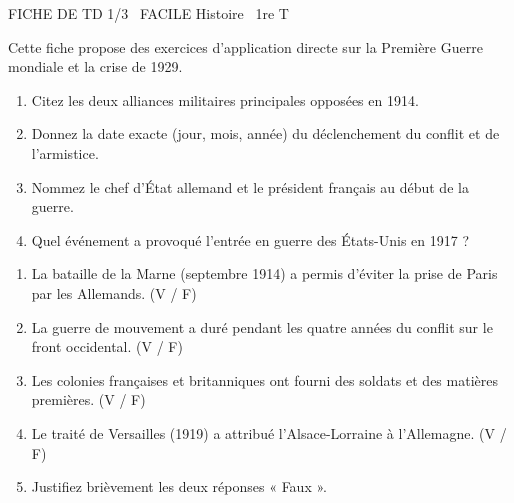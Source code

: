 \documentclass[11pt]{article}
\begin{document}
\begin{tcolorbox}[enhanced,colback=popink,colframe=popink,arc=10pt,boxrule=0pt,left=12pt,right=12pt,top=9pt,bottom=9pt]
{\color{white}\popxbold\small FICHE DE TD 1/3 \textbullet\ FACILE \hfill Histoire \textbullet\ 1re T\par}
\end{tcolorbox}
\vspace{4pt}
Cette fiche propose des exercices d'application directe sur la Première Guerre mondiale et la crise de 1929.

\begin{exercice}
\begin{enumerate}
    \item Citez les deux alliances militaires principales opposées en 1914.
    \item Donnez la date exacte (jour, mois, année) du déclenchement du conflit et de l'armistice.
    \item Nommez le chef d'État allemand et le président français au début de la guerre.
    \item Quel événement a provoqué l'entrée en guerre des États-Unis en 1917 ?
\end{enumerate}
\end{exercice}

\begin{exercice}
\begin{enumerate}
    \item La bataille de la Marne (septembre 1914) a permis d'éviter la prise de Paris par les Allemands. \hfill (V / F)
    \item La guerre de mouvement a duré pendant les quatre années du conflit sur le front occidental. \hfill (V / F)
    \item Les colonies françaises et britanniques ont fourni des soldats et des matières premières. \hfill (V / F)
    \item Le traité de Versailles (1919) a attribué l'Alsace-Lorraine à l'Allemagne. \hfill (V / F)
    \item Justifiez brièvement les deux réponses « Faux ».
\end{enumerate}
\end{exercice}
\end{document}
